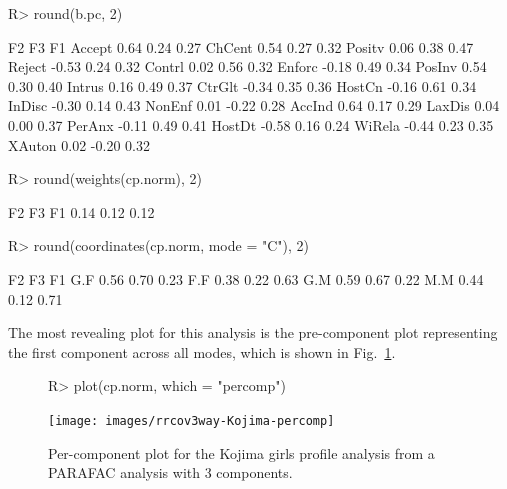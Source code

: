 \documentclass[article,shortnames, nojss]{jss}
\begin{document}
\begin{Schunk}
\begin{Sinput}
R> round(b.pc, 2)
\end{Sinput}
\begin{Soutput}
          F2    F3   F1
Accept  0.64  0.24 0.27
ChCent  0.54  0.27 0.32
Positv  0.06  0.38 0.47
Reject -0.53  0.24 0.32
Contrl  0.02  0.56 0.32
Enforc -0.18  0.49 0.34
PosInv  0.54  0.30 0.40
Intrus  0.16  0.49 0.37
CtrGlt -0.34  0.35 0.36
HostCn -0.16  0.61 0.34
InDisc -0.30  0.14 0.43
NonEnf  0.01 -0.22 0.28
AccInd  0.64  0.17 0.29
LaxDis  0.04  0.00 0.37
PerAnx -0.11  0.49 0.41
HostDt -0.58  0.16 0.24
WiRela -0.44  0.23 0.35
XAuton  0.02 -0.20 0.32
\end{Soutput}
\begin{Sinput}
R> round(weights(cp.norm), 2)
\end{Sinput}
\begin{Soutput}
  F2   F3   F1 
0.14 0.12 0.12 
\end{Soutput}
\begin{Sinput}
R> round(coordinates(cp.norm, mode = "C"), 2)
\end{Sinput}
\begin{Soutput}
      F2   F3   F1
G.F 0.56 0.70 0.23
F.F 0.38 0.22 0.63
G.M 0.59 0.67 0.22
M.M 0.44 0.12 0.71
\end{Soutput}
\end{Schunk}
The most revealing plot for this analysis is the pre-component plot representing
the first component across all modes, which is shown in Fig.~\ref{fig-Kojima-percomp}.
\begin{figure}[H]
\centering
\begin{Schunk}
\begin{Sinput}
R> plot(cp.norm, which = "percomp")
\end{Sinput}
\end{Schunk}
\texttt{[image: images/rrcov3way-Kojima-percomp]}
\caption{Per-component plot for the Kojima girls profile analysis from a PARAFAC analysis with 3 components.}
\label{fig-Kojima-percomp}
\end{figure}
\end{document}
